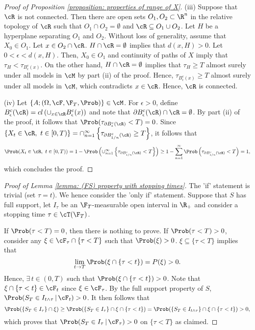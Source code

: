 \documentclass[11pt]{article}
\begin{document}
\begin{proof}[Proof of Proposition \ref{proposition: properties of range of X}]
\item (iii) Suppose that $\cR$ is not connected. Then there are open sets $O_1, O_2 \subset \R^n$ in the relative topology of $\cR$ such that $O_1 \cap O_2 = \emptyset$ and $\cR \subseteq O_1 \cup O_2$. Let $H$ be a hyperplane separating $O_1$ and $O_2$. Without loss of generality, assume that $X_0 \in O_1$. Let $x \in O_2 \cap \cR$. $H \cap \cR = \emptyset$ implies that $d(x,H) > 0$. Let $0 < \epsilon < d(x,H)$. Then, $X_0 \in O_1$ and continuity of paths of $X$ imply that $\tau_H < \tau_{B^c_\epsilon(x)}$. On the other hand, $H \cap \cR = \emptyset$ implies that $\tau_H \geq T$ almost surely under all models in $\cM$ by part (ii) of the proof. Hence, $\tau_{B^c_\epsilon(x)} \geq T$ almost surely under all models in $\cM$, which contradicts $x \in \cR$. Hence, $\cR$ is connected. \\

\item (iv) Let $\{ A; (\Omega, \cF, \F_T, \Prob) \} \in \cM$. For $\epsilon > 0$, define $B^c_\epsilon(\cR) = cl \left( \cup_{x \in \cR} B^c_\epsilon(x) \right)$ and note that $\partial B^c_\epsilon(\cR) \cap \cR = \emptyset$. By part (ii) of the proof, it follows that $\Prob( \tau_{\partial B^c_\epsilon(\cR)} < T) = 0$. Since $\{ X_t \in \cR, \ t \in [0,T) \} =  \cap_{n=1}^\infty \left\{ \tau_{\partial B^c_{1/n}(\cR)} \geq T \right\} 
$, it follows that
$$
\Prob( X_t \in \cR, \ t \in [0,T) ) = 1- \Prob \left( \cup_{n=1}^\infty \left\{ \tau_{\partial B^c_{1/n}(\cR)} < T \right\} \right) \geq 1- \sum_{n=1}^\infty \Prob \left( \tau_{\partial B^c_{1/n}(\cR)} < T \right) = 1,
$$
which concludes the proof.

\end{proof}

\begin{proof}[Proof of Lemma \ref{lemma: (FS) property with stopping times}]

The 'if' statement is trivial (set $\tau = t$). We hence consider the 'only if' statement. Suppose that $S$ has full support, let $I_\tau$ be an $\F_T$-measurable open interval in $\R_+$ and consider a stopping time $\tau \in \cT(\F_T)$.

If $\Prob(\tau < T) = 0$, then there is nothing to prove. If $\Prob(\tau < T) > 0$, consider any $\xi \in \cF_\tau \cap \{ \tau < T \}$ such that $\Prob(\xi) > 0$. $\xi \subseteq \{ \tau < T \}$ implies that 
$$
\lim_{t \to T} \Prob( \xi \cap \{ \tau < t \} ) = P(\xi) > 0.
$$
Hence, $\exists \, t \in (0,T)$ such that $\Prob( \xi \cap \{ \tau < t \} ) > 0$. Note that $\xi \cap \{ \tau < t \} \in \cF_t$ since $\xi \in \cF_\tau$. By the full support property of $S$, $\Prob( S_T \in I_{t \wedge \tau} \, | \, \cF_t) > 0$. It then follows that 
$$
\Prob( \{ S_T \in I_\tau \} \cap \xi ) \geq \Prob( \{ S_T \in I_\tau \} \cap \xi \cap \{ \tau < t \} ) = \Prob( \{ S_T \in I_{t \wedge \tau} \} \cap \xi \cap \{ \tau < t \} ) > 0,
$$
which proves that $\Prob( S_T \in I_\tau \, | \, \cF_\tau ) > 0$ on $\{ \tau < T \}$ as claimed.

\end{proof}
\end{document}
